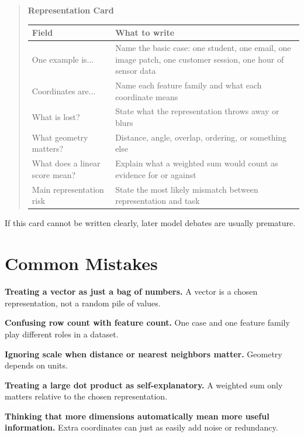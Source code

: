 \begin{quote}
\noindent\textbf{Representation Card}

\medskip
\begin{tabular}{>{\raggedright\arraybackslash}p{2.6cm}>{\raggedright\arraybackslash}p{5.4cm}}
\toprule
Field & What to write \\
\midrule
One example is... & Name the basic case: one student, one email, one image patch, one customer session, one hour of sensor data \\
Coordinates are... & Name each feature family and what each coordinate means \\
What is lost? & State what the representation throws away or blurs \\
What geometry matters? & Distance, angle, overlap, ordering, or something else \\
What does a linear score mean? & Explain what a weighted sum would count as evidence for or against \\
Main representation risk & State the most likely mismatch between representation and task \\
\bottomrule
\end{tabular}
\end{quote}

If this card cannot be written clearly, later model debates are usually premature.

\section*{Common Mistakes}

\begin{mistakebox}
\item \textbf{Treating a vector as just a bag of numbers.} A vector is a chosen representation, not a random pile of values.
\item \textbf{Confusing row count with feature count.} One case and one feature family play different roles in a dataset.
\item \textbf{Ignoring scale when distance or nearest neighbors matter.} Geometry depends on units.
\item \textbf{Treating a large dot product as self-explanatory.} A weighted sum only matters relative to the chosen representation.
\item \textbf{Thinking that more dimensions automatically mean more useful information.} Extra coordinates can just as easily add noise or redundancy.
\end{mistakebox}

